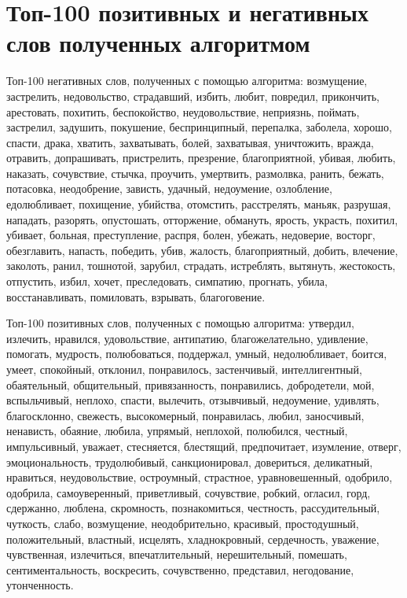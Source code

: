 \chapter{Топ-100 позитивных и негативных слов полученных алгоритмом}
Топ-100 негативных слов, полученных с помощью алгоритма: возмущение, застрелить,
недовольство, страдавший, избить, любит, повредил, прикончить, арестовать,
похитить, беспокойство, неудовольствие, неприязнь, поймать, застрелил, задушить,
покушение, беспринципный, перепалка, заболела, хорошо, спасти, драка, хватить,
захватывать, болей, захватывая, уничтожить, вражда, отравить, допрашивать,
пристрелить, презрение, благоприятной, убивая, любить, наказать, сочувствие,
стычка, проучить, умертвить, размолвка, ранить, бежать, потасовка, неодобрение,
зависть, удачный, недоумение, озлобление, едолюбливает, похищение, убийства,
отомстить, расстрелять, маньяк, разрушая, нападать, разорять, опустошать,
отторжение, обмануть, ярость, украсть, похитил, убивает, больная, преступление,
распря, болен, убежать, недоверие, восторг, обезглавить, напасть, победить, убив, жалость,
благоприятный, добить, влечение, заколоть, ранил, тошнотой, зарубил, страдать,
истреблять, вытянуть, жестокость, отпустить, избил, хочет, преследовать,
симпатию,
прогнать, убила, восстанавливать, помиловать, взрывать, благоговение.

Топ-100 позитивных слов, полученных с помощью алгоритма: утвердил, излечить,
нравился, удовольствие, антипатию, благожелательно, удивление, помогать,
мудрость, полюбоваться, поддержал, умный, недолюбливает, боится, умеет,
спокойный, отклонил, понравилось, застенчивый, интеллигентный, обаятельный,
общительный, привязанность, понравились, добродетели, мой, вспыльчивый, неплохо,
спасти,
вылечить, отзывчивый, недоумение, удивлять, благосклонно, свежесть,
высокомерный, понравилась, любил, заносчивый, ненависть, обаяние, любила,
упрямый, неплохой, полюбился, честный, импульсивный, уважает, стесняется,
блестящий, предпочитает, изумление, отверг, эмоциональность, трудолюбивый,
санкционировал, довериться, деликатный, нравиться, неудовольствие, остроумный,
страстное, уравновешенный, одобрило, одобрила, самоуверенный, приветливый,
сочувствие, робкий, огласил, горд, сдержанно, люблена, скромность,
познакомиться, честность, рассудительный, чуткость, слабо, возмущение,
неодобрительно, красивый, простодушный, положительный, властный, исцелять,
хладнокровный, сердечность, уважение, чувственная, излечиться, впечатлительный,
нерешительный, помешать, сентиментальность, воскресить, сочувственно,
представил, негодование, утонченность.

\FloatBarrier

